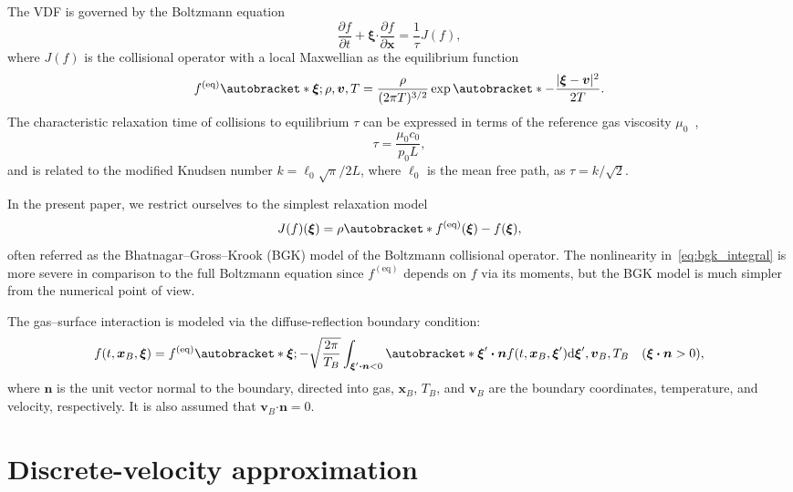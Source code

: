 \documentclass{elsarticle} %
\newcommand{\dd}{\mathrm{d}}
\newcommand{\pder}[2][]{\frac{\partial#1}{\partial#2}}
\DeclarePairedDelimiter\autobracket()       %
\newcommand{\br}[1]{\autobracket*{#1}}
\newcommand{\dxi}{\dd{\boldsymbol{\xi}}}
\newcommand{\bxi}{\boldsymbol{\xi}}
\newcommand{\bv}{\boldsymbol{v}}
\newcommand{\bn}{\boldsymbol{n}}
\newcommand{\bdot}{\boldsymbol{\cdot}}
\newcommand{\bx}{\boldsymbol{x}}
\newcommand{\equil}[1]{#1^\mathrm{(eq)}}
\newcommand{\refer}[1]{#1_0}
\begin{document}
The VDF is governed by the Boltzmann equation
\begin{equation}\label{eq:Boltzmann}
    \pder[f]{t} + \bxi\bdot\pder[f]{\bx} = \frac{1}{\tau} J(f),
\end{equation}
where \(J(f)\) is the collisional operator with a local Maxwellian as the equilibrium function
\begin{equation}\label{eq:equilibrium}
    \equil{f}\br{\bxi; \rho, \bv, T} = \frac{\rho}{(2\pi T)^{3/2}}\exp\br{-\frac{|\bxi-\bv|^2}{2T}}.
\end{equation}
The characteristic relaxation time of collisions to equilibrium \(\tau\)
can be expressed in terms of the reference gas viscosity \(\refer\mu\)~\cite{Cercignani2000, Sone2007},
\begin{equation}\label{eq:tau}
    \tau = \frac{\refer\mu\refer{c}}{\refer{p}L},
\end{equation}
and is related to the modified Knudsen number \(k=\ell_0\sqrt\pi/2L\), where \(\ell_0\) is the mean free path,
as \(\tau = k / \sqrt2\).

In the present paper, we restrict ourselves to the simplest relaxation model~\cite{Krook1954, Welander1954}
\begin{equation}\label{eq:bgk_integral}
    J(f)(\bxi) = \rho\br{\equil{f}(\bxi) - f(\bxi)},
\end{equation}
often referred as the Bhatnagar--Gross--Krook (BGK) model of the Boltzmann collisional operator.
The nonlinearity in~\eqref{eq:bgk_integral} is more severe in comparison to the full Boltzmann equation
since \(\equil{f}\) depends on \(f\) via its moments,
but the BGK model is much simpler from the numerical point of view.

The gas--surface interaction is modeled via the diffuse-reflection boundary condition:
\begin{equation}\label{eq:diffuse}
    f(t,\bx_B,\bxi) = \equil{f} \br{ \bxi;
        -\sqrt\frac{2\pi}{T_B} \int_{\bxi'\bdot\bn<0} \br{ \bxi'\bdot\bn } f(t,\bx_B,\bxi')\dxi', \bv_B, T_B
    } \quad (\bxi\bdot\bn>0),
\end{equation}
where \(\bn\) is the unit vector normal to the boundary, directed into gas,
\(\bx_B\), \(T_B\), and \(\bv_B\) are the boundary coordinates, temperature, and velocity, respectively.
It is also assumed that \(\bv_B\bdot\bn = 0\).

\section{Discrete-velocity approximation}\label{sec:dv}
\end{document}
